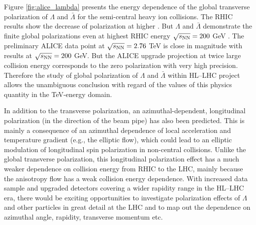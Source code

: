 Figure \ref{fig:alice_lambda} presents the energy dependence of the global transverse polarization of $\Lambda$ and $\bar{\Lambda}$ for the semi-central heavy ion collisions. The RHIC results show the decrease of polarization at higher \snn. But $\Lambda$ and $\bar{\Lambda}$ demonstrate the finite global polarizations even at highest RHIC energy $\sqrt{s_{\mathrm{NN}}}=200$ GeV \cite{PRC-98-014910-2018}. The preliminary ALICE data point at $\sqrt{s_{\mathrm{NN}}}=2.76$ TeV is close in magnitude with results at $\sqrt{s_{\mathrm{NN}}}=200$ GeV. But the ALICE upgrade projection at twice large collision energy corresponds to the zero polarization with very high precision. Therefore the study of global polarization of $\Lambda$ and $\bar{\Lambda}$ within HL--LHC project allows the unambiguous conclusion with regard of the values of this physics quantity in the TeV-energy domain.    

In addition to the transverse polarization, an azimuthal-dependent, longitudinal polarization (in the direction of the beam pipe) has also been predicted. This is mainly a consequence of an azimuthal dependence of local acceleration and temperature gradient (e.g., the elliptic flow),
which could lead to an elliptic modulation of longitudinal spin polarization in non-central collisions. Unlike the global transverse polarization,
this longitudinal polarization effect has a much weaker dependence on collision energy from RHIC to the LHC\cite{Karpenko:2017dui}, mainly because the anisotropy flow has a weak collision energy dependence. With increased data sample and upgraded detectors covering a wider rapidity range in the HL--LHC era, there would be exciting opportunities to investigate polarization effects of $\Lambda$ and other particles in great detail at the LHC and to map out the dependence on azimuthal angle, rapidity, transverse momentum etc.

